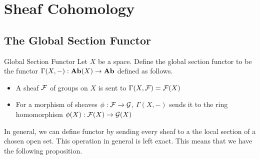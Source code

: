 \documentclass[a4paper]{article}
\begin{document}
\pagebreak
\section{Sheaf Cohomology}
\subsection{The Global Section Functor}
\begin{defn}{Global Section Functor}{} Let $X$ be a space. Define the global section functor to be the functor $\Gamma(X,-):\bold{Ab}(X)\to\bold{Ab}$ defined as follows. 
\begin{itemize}
\item A sheaf $\mathcal{F}$ of groups on $X$ is sent to $\Gamma(X,\mathcal{F})=\mathcal{F}(X)$
\item For a morphism of sheaves $\phi:\mathcal{F}\to\mathcal{G}$, $\Gamma(X,-)$ sends it to the ring homomorphism $\phi(X):\mathcal{F}(X)\to\mathcal{G}(X)$
\end{itemize}
\end{defn}

In general, we can define functor by sending every sheaf to a the local section of a chosen open set. This operation in general is left exact. This means that we have the following proposition. 
\end{document}
